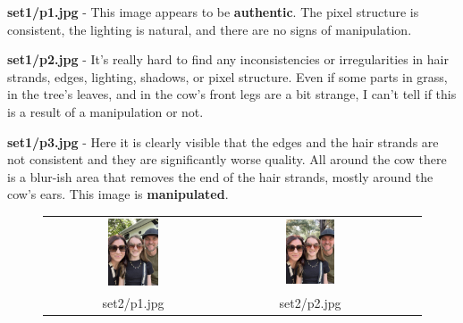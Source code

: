 \documentclass[pdflatex,sn-mathphys-num]{sn-jnl}
\begin{document}
\par \textbf{set1/p1.jpg} \-- This image appears to be \textbf{authentic}. The pixel structure is consistent, the
lighting is natural, and there are no signs of manipulation.

\par \textbf{set1/p2.jpg} \-- It's really hard to find any inconsistencies or irregularities in hair strands, edges,
lighting, shadows, or pixel structure. Even if some parts in grass, in the tree's leaves, and in the cow's front legs
are a bit strange, I can't tell if this is a result of a manipulation or not.

\par \textbf{set1/p3.jpg} \-- Here it is clearly visible that the edges and the hair strands are not consistent and
they are significantly worse quality. All around the cow there is a blur-ish area that removes the end of the hair
strands, mostly around the cow's ears. This image is \textbf{manipulated}.

\begin{figure}[htbp]
    \centering
    \begin{tabular}{cccc}
        \includegraphics[width=0.3\textwidth]{images/set2/p1.jpg} &
        \includegraphics[width=0.3\textwidth]{images/set2/p2.jpg} \\
        set2/p1.jpg & set2/p2.jpg
    \end{tabular}
    \label{fig:set2_images}
\end{figure}
\end{document}
